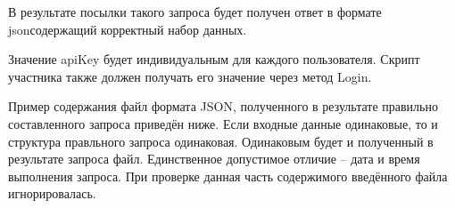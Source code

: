 В результате посылки такого запроса будет получен ответ в формате jsonсодержащий корректный набор данных.

Значение apiKey будет индивидуальным для каждого пользователя. Скрипт участника также должен получать его значение через метод Login.

\answerMath

Пример содержания файл формата JSON, полученного в результате правильно составленного запроса приведён ниже. Если входные данные одинаковые, то и структура правльного запроса одинаковая. Одинаковым будет и полученный в результате запроса файл. Единственное допустимое отличие – дата и время выполнения запроса. При проверке данная часть содержимого введённого файла игнорировалась.

\inputminted[fontsize=\footnotesize, linenos]{json}{2nd_tour/analysis_cosm/task_04/source.json}